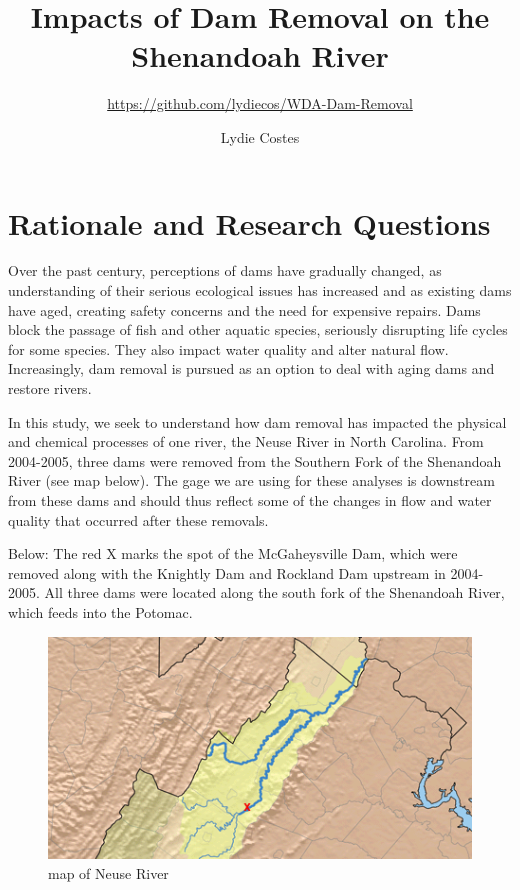 \documentclass[
  12pt,
]{article}
\title{Impacts of Dam Removal on the Shenandoah River}
\subtitle{\url{https://github.com/lydiecos/WDA-Dam-Removal}}
\author{Lydie Costes}
\date{}
\begin{document}
\maketitle

\newpage

\hypertarget{rationale-and-research-questions}{%
\section{Rationale and Research
Questions}\label{rationale-and-research-questions}}

Over the past century, perceptions of dams have gradually changed, as
understanding of their serious ecological issues has increased and as
existing dams have aged, creating safety concerns and the need for
expensive repairs. Dams block the passage of fish and other aquatic
species, seriously disrupting life cycles for some species. They also
impact water quality and alter natural flow. Increasingly, dam removal
is pursued as an option to deal with aging dams and restore rivers.

In this study, we seek to understand how dam removal has impacted the
physical and chemical processes of one river, the Neuse River in North
Carolina. From 2004-2005, three dams were removed from the Southern Fork
of the Shenandoah River (see map below). The gage we are using for these
analyses is downstream from these dams and should thus reflect some of
the changes in flow and water quality that occurred after these
removals.

Below: The red X marks the spot of the McGaheysville Dam, which were
removed along with the Knightly Dam and Rockland Dam upstream in
2004-2005. All three dams were located along the south fork of the
Shenandoah River, which feeds into the Potomac.

\begin{figure}
\centering
\includegraphics{../Figures-and-Maps/mcgaheysvilledam.png}
\caption{map of Neuse River}
\end{figure}
\end{document}
